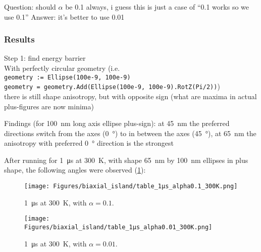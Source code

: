 \documentclass[10pt,a4paper]{article}
\newcommand{\code}[1]{\texttt{#1}}
\begin{document}
Question: should $\alpha$ be 0.1 always, i guess this is just a case of ``0.1 works so we use 0.1''
Answer: it's better to use 0.01

\subsubsection{Results}
Step 1: find energy barrier \\
With perfectly circular geometry (i.e. \\
\code{geometry := Ellipse(100e-9, 100e-9)} \\
\code{geometry = geometry.Add(Ellipse(100e-9, 100e-9).RotZ(Pi/2))}) \\
there is still shape anisotropy, but with opposite sign (what are maxima in actual plus-figures are now minima)

Findings (for \SI{100}{\nano\metre} long axis ellipse plus-sign):
at \SI{45}{\nano\metre} the preferred directions switch from the axes (\SI{0}{\degree}) to in between the axes (\SI{45}{\degree}),
at \SI{65}{\nano\metre} the anisotropy with preferred \SI{0}{\degree} direction is the strongest

After running for \SI{1}{\micro\second} at \SI{300}{\kelvin}, with shape \SI{65}{\nano\metre} by \SI{100}{\nano\metre} ellipses in plus shape, the following angles were observed (\cref{fig:biaxial_island:1microsecond_300K_alpha0.1}):
\begin{figure}
    \centering
    \texttt{[image: Figures/biaxial\_island/table\_1µs\_alpha0.1\_300K.png]}
    \caption{\SI{1}{\micro\second} at \SI{300}{\kelvin}, with $\alpha=0.1$.}
    \label{fig:biaxial_island:1microsecond_300K_alpha0.1}
\end{figure}
\begin{figure}
    \centering
    \texttt{[image: Figures/biaxial\_island/table\_1µs\_alpha0.01\_300K.png]}
    \caption{\SI{1}{\micro\second} at \SI{300}{\kelvin}, with $\alpha=0.01$.}
    \label{fig:biaxial_island:1microsecond_300K_alpha0.01}
\end{figure}


\newpage


\end{document}
